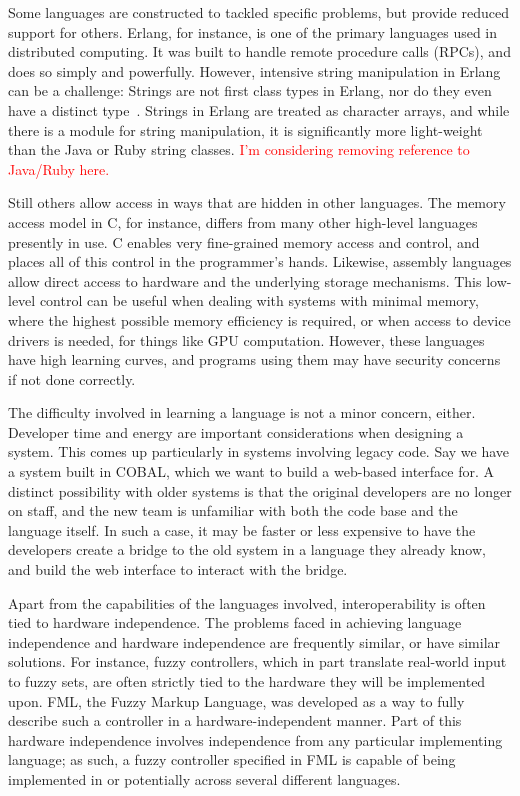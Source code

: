 \documentclass{sig-alternate}
\newcommand{\mycomment}[1]{\textcolor{red}{#1}}
\begin{document}
Some languages are constructed to tackled specific problems, but provide reduced support for others. Erlang, for instance, is one of the primary languages used in distributed computing. It was built to handle remote procedure calls (RPCs), and does so simply and powerfully. However, intensive string manipulation in Erlang can be a challenge: Strings are not first class types in Erlang, nor do they even have a distinct type~\cite{ErlangTypeDoc}. Strings in Erlang are treated as character arrays, and while there is a module for string manipulation, it is significantly more light-weight than the Java or Ruby string classes. \mycomment{I'm considering removing reference to Java/Ruby here.}

Still others allow access in ways that are hidden in other languages. The memory access model in C, for instance, differs from many other high-level languages presently in use. C enables very fine-grained memory access and control, and places all of this control in the programmer's hands. Likewise, assembly languages allow direct access to hardware and the underlying storage mechanisms. This low-level control can be useful when dealing with systems with minimal memory, where the highest possible memory efficiency is required, or when access to device drivers is needed, for things like GPU computation.  However, these languages have high learning curves, and programs using them may have security concerns if not done correctly.

The difficulty involved in learning a language is not a minor concern, either. Developer time and energy are important considerations when designing a system.
This comes up particularly in systems involving legacy code. Say we have a system built in COBAL, which we want to build a web-based interface for. A distinct possibility with older systems is that the original developers are no longer on staff, and the new team is unfamiliar with both the code base and the language itself. In such a case, it may be faster or less expensive to have the developers create a bridge to the old system in a language they already know, and build the web interface to interact with the bridge. 


Apart from the capabilities of the languages involved, interoperability is often tied to hardware independence. The problems faced in achieving language independence and hardware independence are frequently similar, or have similar solutions. For instance, fuzzy controllers, which in part translate real-world input to fuzzy sets, are often strictly tied to the hardware they will be implemented upon. FML, the Fuzzy Markup Language, was developed as a way to fully describe such a controller in a hardware-independent manner. Part of this hardware independence involves independence from any particular implementing language; as such, a fuzzy controller specified in FML is capable of being implemented in or potentially across several different languages.~\cite{Acampora:2013}
\end{document}
